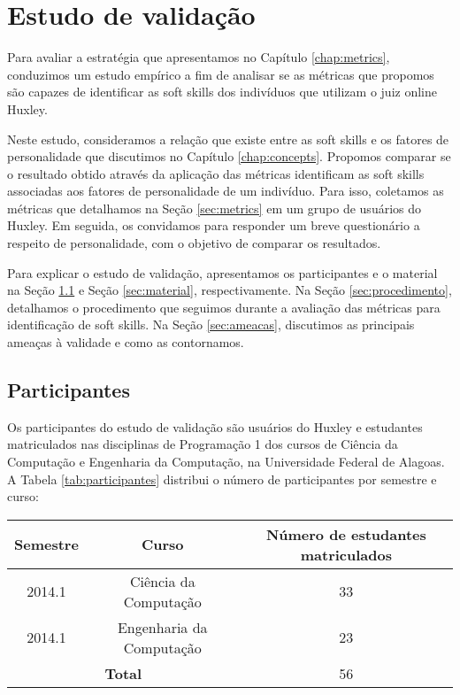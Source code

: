 

\chapter{Estudo de validação}

\label{chap:evaluation}

Para avaliar a estratégia que apresentamos no Capítulo \ref{chap:metrics}, conduzimos um estudo empírico a fim de analisar se as métricas que propomos são capazes de identificar as soft skills dos indivíduos que utilizam o juiz online Huxley.

Neste estudo, consideramos a relação que existe entre as soft skills e os fatores de personalidade que discutimos no Capítulo \ref{chap:concepts}. Propomos comparar se o resultado obtido através da aplicação das métricas identificam as soft skills associadas aos fatores de personalidade de um indivíduo. Para isso, coletamos as métricas que detalhamos na Seção \ref{sec:metrics} em um grupo de usuários do Huxley. Em seguida, os convidamos para responder um breve questionário a respeito de personalidade, com o objetivo de comparar os resultados. 

Para explicar o estudo de validação, apresentamos os participantes e o material na Seção \ref{sec:participantes} e Seção \ref{sec:material}, respectivamente. Na Seção \ref{sec:procedimento}, detalhamos o procedimento que seguimos durante a avaliação das métricas para identificação de soft skills. Na Seção \ref{sec:ameacas}, discutimos as principais ameaças à validade e como as contornamos.

\section{Participantes}
\label{sec:participantes}

Os participantes do estudo de validação são usuários do Huxley e estudantes matriculados nas disciplinas de Programação 1 dos cursos de Ciência da Computação e Engenharia da Computação, na Universidade Federal de Alagoas. A Tabela \ref{tab:participantes} distribui o número de participantes por semestre e curso:

\begin{table*}[ht]
\footnotesize
\caption{\small Participantes}
\addtolength{\tabcolsep}{-3.5pt}
\renewcommand{\arraystretch}{1.4} 
\centering

\begin{tabular}{|c|c|c|}
\hline
\textbf{Semestre} & \textbf{Curso} 		& 	\textbf{Número de estudantes matriculados} \\ \hline
2014.1 & Ciência da Computação 		 		& 	33 		\\ \hline
2014.1 & Engenharia da Computação 		& 	23 		\\ \hline
\multicolumn{2}{|c|}{\textbf{Total}} 	&		56 		\\ \hline
\end{tabular}

\label{tab:participantes}
\end{table*}

